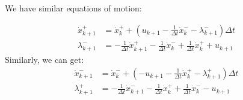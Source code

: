 \documentclass{article}
\begin{document}
We have similar equations of motion:

\begin{align*}
    \dot x^+_{k+1} &= \dot x^+_k + (u_{k+1} - \frac{1}{\Delta t} \dot x^-_{k} - \lambda^-_{k+1}) \Delta t \\
    \lambda^-_{k+1} &= -\frac{1}{\Delta t} \dot x^+_{k+1} - \frac{1}{\Delta t} \dot x^-_{k} + \frac{1}{\Delta t} \dot x^+_k + u_{k+1}
\end{align*}
Similarly, we can get:
\begin{align*}
    \dot x^-_{k+1} &= \dot x^-_k + (-u_{k+1} - \frac{1}{\Delta t} \dot x^+_{k} - \lambda^+_{k+1}) \Delta t \\
    \lambda^+_{k+1} &= - \frac{1}{\Delta t} \dot x^-_{k+1} - \frac{1}{\Delta t} \dot x^+_{k} + \frac{1}{\Delta t} \dot x^-_k - u_{k+1}
\end{align*}
\end{document}

